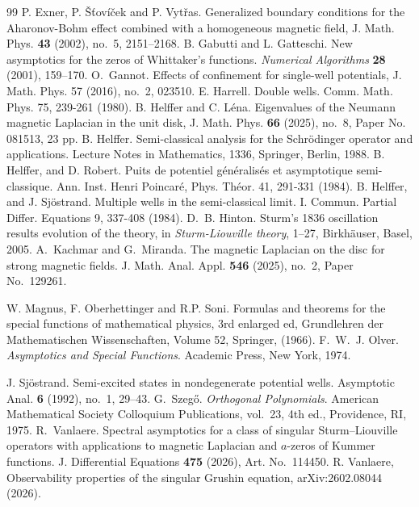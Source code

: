 \documentclass[11pt]{amsart}
\numberwithin{equation}{section}
\theoremstyle{remark}
\begin{document}
\begin{thebibliography}{99}
 P. Exner, P. \v S\v tov\'i\v cek and P. Vyt\v ras. \newblock Generalized boundary conditions for the Aharonov-Bohm effect combined with a homogeneous magnetic field, \newblock  J. Math. Phys. {\bf 43} (2002), no.~5, 2151--2168.
%	
B. Gabutti and L. Gatteschi.
\newblock New asymptotics for the zeros of Whittaker's functions.
\newblock \emph{Numerical Algorithms} \textbf{28} (2001), 159--170.
%
O.~Gannot.
\newblock Effects of confinement for single-well potentials,
\newblock J. Math. Phys. 57 (2016), no.~2, 023510.
%
 E. Harrell. \newblock
Double wells. \newblock
Comm. Math. Phys. 75, 239-261 (1980).
%
 B. Helffer and C. L\'ena. Eigenvalues of the Neumann magnetic Laplacian in the unit disk, J. Math. Phys. {\bf 66} (2025), no.~8, Paper No. 081513, 23 pp.
%
 B. Helffer. \newblock Semi-classical analysis for the Schr\"odinger operator and applications. \newblock Lecture Notes in Mathematics, 1336, Springer, Berlin, 1988.    
%
 B. Helffer, and D. Robert. \newblock
Puits de potentiel g\'en\'eralis\'es et asymptotique semi-classique. \newblock
Ann. Inst. Henri Poincaré, Phys. Th\'eor. 41, 291-331 (1984).    
%	
 B. Helffer, and J. Sj\"ostrand. \newblock
Multiple wells in the semi-classical limit. I. \newblock
Commun. Partial Differ. Equations 9, 337-408 (1984).	
%
 D.~B. Hinton. Sturm's 1836 oscillation results evolution of the theory, in {\it Sturm-Liouville theory}, 1--27, Birkh\"auser, Basel, 2005.
%
A.~Kachmar and G.~Miranda.
\newblock The magnetic Laplacian on the disc for strong magnetic fields.
\newblock J. Math. Anal. Appl. \textbf{546} (2025), no.~2, Paper No.~129261.
%	

%	
	 W. Magnus, F. Oberhettinger and R.P. Soni.
	\newblock Formulas and theorems for the special functions of mathematical physics,  3rd enlarged ed, 
	\newblock Grundlehren der Mathematischen Wissenschaften,
	\newblock Volume 52,
	\newblock Springer,  (1966).
%	
F.~W.~J. Olver.
\newblock \emph{Asymptotics and Special Functions}.
\newblock Academic Press, New York, 1974.


 J. Sj\"ostrand. \newblock Semi-excited states in nondegenerate potential wells. \newblock Asymptotic Anal. {\bf 6} (1992), no.~1, 29--43.
%
G.~Szeg\H{o}.
\newblock \emph{Orthogonal Polynomials}.
\newblock American Mathematical Society Colloquium Publications,
vol.~23, 4th ed., Providence, RI, 1975.
R.~Vanlaere.
\newblock Spectral asymptotics for a class of singular Sturm--Liouville
operators with applications to magnetic Laplacian and $a$-zeros of
Kummer functions.
\newblock J. Differential Equations \textbf{475} (2026),
Art. No.~114450.
%
    R. Vanlaere,
    \newblock
 Observability properties of the singular {Grushin} equation,
 \newblock
arXiv:2602.08044 (2026).
%
\end{thebibliography}
\end{document}
